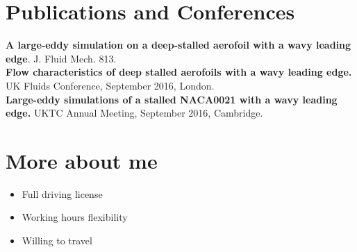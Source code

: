 \documentclass[fontsize=10pt]{tccv}
\begin{document}
\vspace{-35pt}
\section{Publications and Conferences} 
\textbf{A large-eddy simulation on a deep-stalled aerofoil with a wavy leading edge}. J. Fluid Mech. 813.\\
\textbf{Flow characteristics of deep stalled aerofoils with a wavy
leading edge.} UK Fluids Conference, September 2016, London. \\
\textbf{Large-eddy simulations of a stalled NACA0021 with a wavy
leading edge.} UKTC Annual Meeting, September 2016, Cambridge.

\vspace{-20pt}
\section{More about me} 
\begin{itemize}
	\itemsep -1pt
	\item Full driving license
	\item Working hours flexibility
	\item Willing to travel
\end{itemize}
\end{document}
